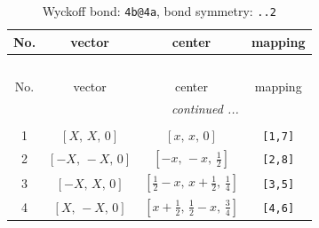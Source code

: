 \documentclass[fleqn,8pt]{jsarticle}
\begin{document}
\begin{longtable}{cccc}
\caption{Wyckoff bond: {\tt 4b@4a}, bond symmetry: {\tt ..2}}
 \\
 \hline \hline
No. & vector & center & mapping \\ \hline \endfirsthead

\multicolumn{3}{l}{\tablename\ \thetable{}} \\
 \hline \hline
No. & vector & center & mapping \\ \hline \endhead

 \hline \hline
\multicolumn{3}{r}{\footnotesize\it continued ...} \\ \endfoot

 \hline \hline
\multicolumn{3}{r}{} \\ \endlastfoot

1 & $\left[ X,\, X,\, 0 \right]$ & $\left[ x,\, x,\, 0 \right]$ & {\tt [1,7]} \\ \hline
2 & $\left[ - X,\, - X,\, 0 \right]$ & $\left[ - x,\, - x,\, \frac{1}{2} \right]$ & {\tt [2,8]} \\ \hline
3 & $\left[ - X,\, X,\, 0 \right]$ & $\left[ \frac{1}{2} - x,\, x + \frac{1}{2},\, \frac{1}{4} \right]$ & {\tt [3,5]} \\ \hline
4 & $\left[ X,\, - X,\, 0 \right]$ & $\left[ x + \frac{1}{2},\, \frac{1}{2} - x,\, \frac{3}{4} \right]$ & {\tt [4,6]} \\
\end{longtable}
\renewcommand{\arraystretch}{1.2}
\end{document}
